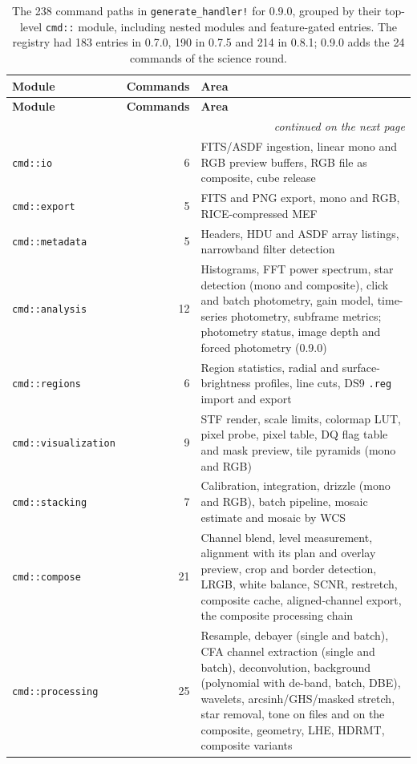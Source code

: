 \documentclass[11pt,a4paper]{article}
\newcommand{\code}[1]{\texttt{\small #1}}
\newcommand{\nCommands}{238}
\begin{document}
    \begingroup
    \small
    \setlength{\LTcapwidth}{\textwidth}
    \begin{longtable}{lr>{\raggedright\arraybackslash}p{9.4cm}}
    \toprule
    \textbf{Module} & \textbf{Commands} & \textbf{Area} \\
    \midrule
    \endfirsthead
    \toprule
    \textbf{Module} & \textbf{Commands} & \textbf{Area} \\
    \midrule
    \endhead
    \midrule
    \multicolumn{3}{r}{\footnotesize\textit{continued on the next page}} \\
    \endfoot
    \bottomrule
    \caption{The \nCommands{} command paths in \code{generate\_handler!} for 0.9.0, grouped by their top-level \code{cmd::} module, including nested modules and feature-gated entries. The registry had 183 entries in 0.7.0, 190 in 0.7.5 and 214 in 0.8.1; 0.9.0 adds the 24 commands of the science round.}
    \endlastfoot
    \code{cmd::io} & 6 & FITS/ASDF ingestion, linear mono and RGB preview buffers, RGB file as composite, cube release \\
    \code{cmd::export} & 5 & FITS and PNG export, mono and RGB, RICE-compressed MEF \\
    \code{cmd::metadata} & 5 & Headers, HDU and ASDF array listings, narrowband filter detection \\
    \code{cmd::analysis} & 12 & Histograms, FFT power spectrum, star detection (mono and composite), click and batch photometry, gain model, time-series photometry, subframe metrics; photometry status, image depth and forced photometry (0.9.0) \\
    \code{cmd::regions} & 6 & Region statistics, radial and surface-brightness profiles, line cuts, DS9 \code{.reg} import and export \\
    \code{cmd::visualization} & 9 & STF render, scale limits, colormap LUT, pixel probe, pixel table, DQ flag table and mask preview, tile pyramids (mono and RGB) \\
    \code{cmd::stacking} & 7 & Calibration, integration, drizzle (mono and RGB), batch pipeline, mosaic estimate and mosaic by WCS \\
    \code{cmd::compose} & 21 & Channel blend, level measurement, alignment with its plan and overlay preview, crop and border detection, LRGB, white balance, SCNR, restretch, composite cache, aligned-channel export, the composite processing chain \\
    \code{cmd::processing} & 25 & Resample, debayer (single and batch), CFA channel extraction (single and batch), deconvolution, background (polynomial with de-band, batch, DBE), wavelets, arcsinh/GHS/masked stretch, star removal, tone on files and on the composite, geometry, LHE, HDRMT, composite variants \\

\end{longtable}
\end{document}
